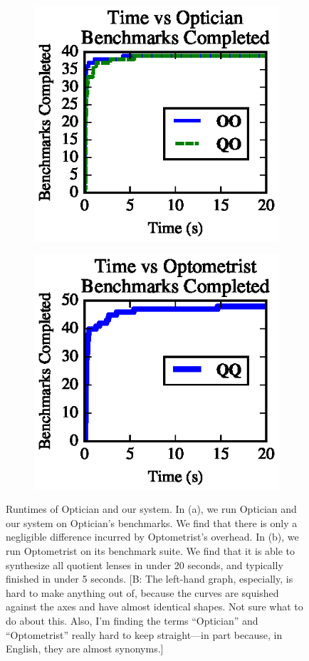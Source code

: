 \documentclass[acmsmall,review,anonymous]{acmart}
\newcommand{\FINISH}[3]{\ifdraft\textcolor{#1}{[#2: #3]}\fi}
\newcommand{\bcp}[1]{\FINISH{dkred}{B}{#1}}
\begin{document}
\begin{figure}[t]
\centering
\begin{subfigure}[b]{.49\textwidth}
\centering
\includegraphics{generated-graphs/times_opt}
\caption{}
\label{subfig:lenssize}
\end{subfigure}
\begin{subfigure}[b]{.49\textwidth}
\includegraphics{generated-graphs/times_new.eps}
\caption{}
\label{subfig:examplesused}
\end{subfigure}
\caption{Runtimes of Optician and our system.
In (a), we run Optician and our system on Optician's benchmarks.  We find that
there is only a negligible difference incurred by Optometrist's overhead.
In (b), we run Optometrist on its benchmark suite.  We find that it is able
to synthesize all quotient lenses in under 20 seconds, and typically
finished in under 5 seconds. \bcp{The left-hand graph, especially, is hard
  to make anything out of, because the curves are squished against the
  axes and have almost identical shapes.  Not sure what to do about this.
  Also, I'm finding the terms 
  ``Optician'' and ``Optometrist'' really hard to keep straight---in part
  because, in English, they are almost synonyms.}}
\label{fig:times}
\end{figure}
\end{document}
